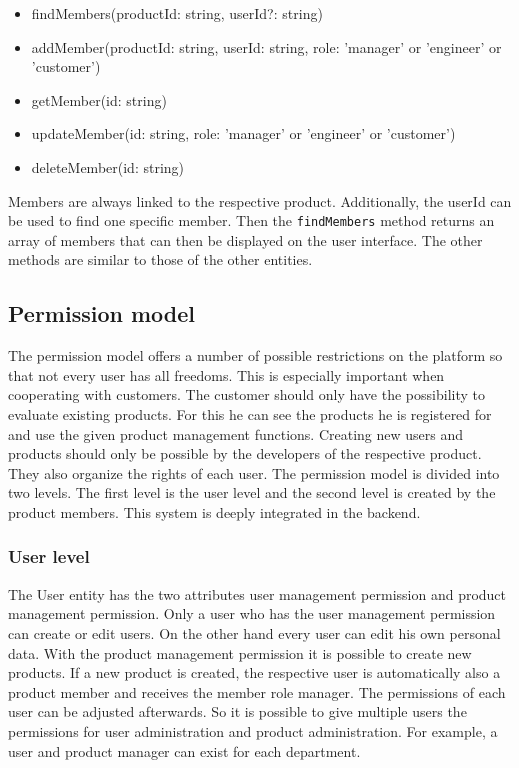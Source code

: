     \begin{itemize}
        \item findMembers(productId: string, userId?: string)
        \item addMember(productId: string, userId: string, role: 'manager' or 'engineer' or 'customer')
        \item getMember(id: string)
        \item updateMember(id: string, role: 'manager' or 'engineer' or 'customer')
        \item deleteMember(id: string)
    \end{itemize}

    Members are always linked to the respective product. Additionally, the userId can be used to find one specific member. Then the \texttt{findMembers} method returns an array of members that can then be displayed on the user interface. The other methods are similar to those of the other entities.

    \subsection*{Permission model}
    The permission model offers a number of possible restrictions on the platform so that not every user has all freedoms. This is especially important when cooperating with customers. The customer should only have the possibility to evaluate existing products. For this he can see the products he is registered for and use the given product management functions. Creating new users and products should only be possible by the developers of the respective product. They also organize the rights of each user. The permission model is divided into two levels. The first level is the user level and the second level is created by the product members. This system is deeply integrated in the backend.

    \subsubsection*{User level}
    The User entity has the two attributes user management permission and product management permission. Only a user who has the user management permission can create or edit users. On the other hand every user can edit his own personal data. With the product management permission it is possible to create new products. If a new product is created, the respective user is automatically also a product member and receives the member role manager. The permissions of each user can be adjusted afterwards. So it is possible to give multiple users the permissions for user administration and product administration. For example, a user and product manager can exist for each department. 

